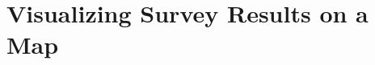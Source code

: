 \documentclass[12pt,letterpaper,english,bibliography=totocnumbered, abstract=on]{scrartcl}
\begin{document}







\section{Visualizing Survey Results on a Map}




\printbibliography	
\end{document}
